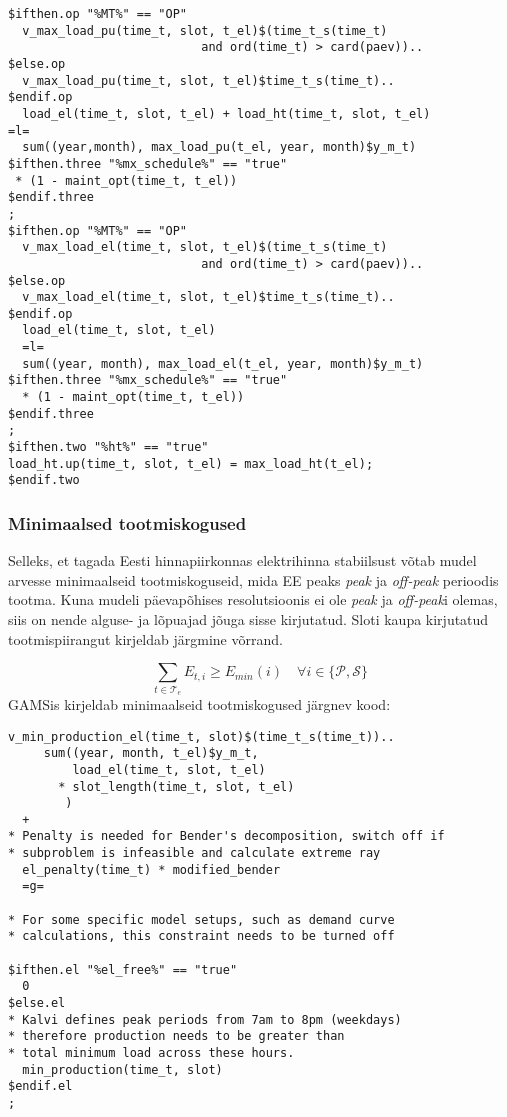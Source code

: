 \documentclass[10pt,a4paper]{article}
\begin{document}
\begin{verbatim}
$ifthen.op "%MT%" == "OP"
  v_max_load_pu(time_t, slot, t_el)$(time_t_s(time_t)
                           and ord(time_t) > card(paev))..
$else.op
  v_max_load_pu(time_t, slot, t_el)$time_t_s(time_t)..
$endif.op
  load_el(time_t, slot, t_el) + load_ht(time_t, slot, t_el)
=l=
  sum((year,month), max_load_pu(t_el, year, month)$y_m_t)
$ifthen.three "%mx_schedule%" == "true"
 * (1 - maint_opt(time_t, t_el))
$endif.three
;
$ifthen.op "%MT%" == "OP"
  v_max_load_el(time_t, slot, t_el)$(time_t_s(time_t)
                           and ord(time_t) > card(paev))..
$else.op
  v_max_load_el(time_t, slot, t_el)$time_t_s(time_t)..
$endif.op
  load_el(time_t, slot, t_el)
  =l=
  sum((year, month), max_load_el(t_el, year, month)$y_m_t)
$ifthen.three "%mx_schedule%" == "true"
  * (1 - maint_opt(time_t, t_el))
$endif.three
;
$ifthen.two "%ht%" == "true"
load_ht.up(time_t, slot, t_el) = max_load_ht(t_el);
$endif.two
\end{verbatim}

\subsubsection{Minimaalsed tootmiskogused}
Selleks, et tagada Eesti hinnapiirkonnas elektrihinna stabiilsust võtab mudel arvesse minimaalseid tootmiskoguseid, mida EE peaks \emph{peak} ja \emph{off-peak} perioodis tootma. Kuna mudeli päevapõhises resolutsioonis ei ole \emph{peak} ja \emph{off-peak}i olemas, siis on nende alguse- ja lõpuajad jõuga sisse kirjutatud. Sloti kaupa kirjutatud tootmispiirangut kirjeldab järgmine võrrand.

\begin{equation}
\sum_{t \in \mathcal{T}_e} E_{t,i}\geq \mathit{E}_{min}(i) \quad  \forall i \in \{\mathcal{P}, \mathcal{S} \} \label{min1}
\end{equation}
GAMSis kirjeldab minimaalseid tootmiskogused järgnev kood:

\begin{verbatim}
v_min_production_el(time_t, slot)$(time_t_s(time_t))..
     sum((year, month, t_el)$y_m_t,
         load_el(time_t, slot, t_el)
       * slot_length(time_t, slot, t_el)
        )
  +
* Penalty is needed for Bender's decomposition, switch off if 
* subproblem is infeasible and calculate extreme ray
  el_penalty(time_t) * modified_bender
  =g=

* For some specific model setups, such as demand curve 
* calculations, this constraint needs to be turned off

$ifthen.el "%el_free%" == "true"
  0
$else.el
* Kalvi defines peak periods from 7am to 8pm (weekdays)
* therefore production needs to be greater than
* total minimum load across these hours.
  min_production(time_t, slot)
$endif.el
;
\end{verbatim}
\end{document}
